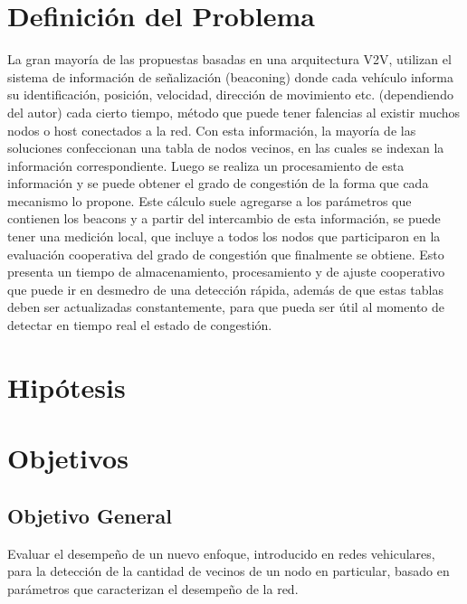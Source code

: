 \section{Definición del Problema}
La gran mayoría de las propuestas basadas en una arquitectura V2V, utilizan el sistema de información de señalización (beaconing) donde cada vehículo informa su identificación, posición, velocidad, dirección de movimiento etc. (dependiendo del autor) cada cierto tiempo, método que puede tener falencias al existir muchos nodos o host conectados a la red. Con esta información, la mayoría de las soluciones confeccionan una tabla de nodos vecinos, en las cuales se indexan la información correspondiente. Luego se realiza un procesamiento de esta información y se puede obtener el grado de congestión de la forma que cada mecanismo lo propone. Este cálculo suele agregarse a los parámetros que contienen los beacons  y a partir del intercambio de esta información, se puede tener una medición local, que incluye a todos los nodos que participaron en la evaluación cooperativa del grado de congestión que finalmente se obtiene.  Esto presenta un tiempo de almacenamiento, procesamiento y de ajuste cooperativo que puede ir en desmedro de una detección rápida, además de que estas tablas deben ser actualizadas constantemente, para que pueda ser útil al momento de detectar en tiempo real el estado de congestión.

\section{Hipótesis}


\section{Objetivos}

\subsection{Objetivo General}

Evaluar el desempeño de un nuevo enfoque, introducido en redes vehiculares, para la detección de la cantidad de vecinos de un nodo en particular, basado en parámetros que caracterizan el desempeño de la red.
